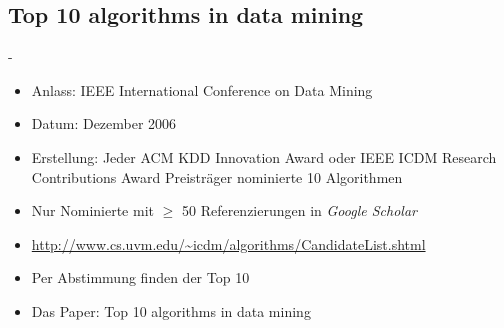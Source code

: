 \documentclass[fleqn,11pt,aspectratio=43]{beamer}
\begin{document}
\subsection{Top 10 algorithms in data mining~}
\begin{frame}{\insertsectionhead - \insertsubsectionhead \cite{wu2008top}}
\begin{itemize}
\item Anlass: IEEE International Conference on Data Mining
\item Datum: Dezember 2006
\item Erstellung: Jeder ACM KDD Innovation Award oder IEEE ICDM Research 
Contributions Award Preisträger nominierte 10 Algorithmen
\item Nur Nominierte mit $\geq$ 50 Referenzierungen in \emph{Google Scholar}
\item 
{\small\url{http://www.cs.uvm.edu/~icdm/algorithms/CandidateList.shtml}}
\item Per Abstimmung finden der Top 10
\item Das Paper: Top 10 algorithms in data mining  \cite{wu2008top}
\end{itemize}
\end{frame}
\end{document}
